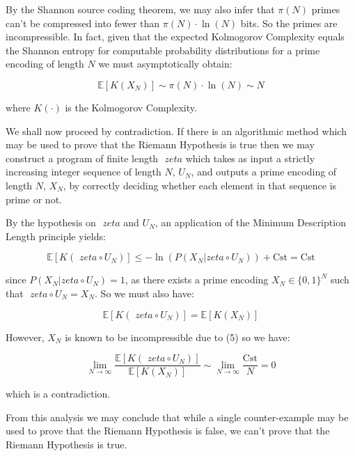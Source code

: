 \documentclass{article}
\begin{document}
By the Shannon source coding theorem, we may also infer that $\pi(N)$ primes can't be compressed into fewer than $\pi(N) \cdot \ln(N)$ bits. So the primes are incompressible. In fact, given that the expected Kolmogorov Complexity equals the Shannon entropy for computable probability distributions for a prime encoding of length $N$ we must asymptotically obtain:

\begin{equation}
\mathbb{E}[K(X_N)] \sim \pi(N) \cdot \ln(N) \sim N
\end{equation}

where $K(\cdot)$ is the Kolmogorov Complexity.

We shall now proceed by contradiction. If there is an algorithmic method which may be used to prove that the Riemann Hypothesis is true then we may construct a program of finite length $\textit{ zeta}$ which takes as input a strictly increasing integer sequence of length $N$, $U_N$, and outputs a prime encoding of length $N$, $X_N$, by correctly deciding whether each element in that sequence is prime or not.

By the hypothesis on $\textit{ zeta}$ and $U_N$, an application of the Minimum Description Length principle yields:

\begin{equation}
\mathbb{E}[K(\textit{ zeta} \circ U_N)] \leq -\ln(P(X_N \lvert \textit{zeta} \circ U_N)) + \text{Cst} = \text{Cst} 	
\end{equation}

since $P(X_N \lvert \textit{zeta} \circ U_N) = 1$, as there exists a prime encoding $X_N \in \{0,1\}^N$ such that $\textit{ zeta} \circ U_N = X_N$. So we must also have:

\begin{equation}
\mathbb{E}[K(\textit{ zeta} \circ U_N)] = \mathbb{E}[K(X_N)]
\end{equation}

However, $X_N$ is known to be incompressible due to (5) so we have:

\begin{equation}
\lim_{N \to \infty} \frac{\mathbb{E}[K(\textit{ zeta} \circ U_N)]}{\mathbb{E}[K(X_N)]} \sim \lim_{N \to \infty} \frac{\text{Cst}}{N} = 0
\end{equation}

which is a contradiction.

From this analysis we may conclude that while a single counter-example may be used to prove that the Riemann Hypothesis is false, we can't prove that the Riemann Hypothesis is true. 
\end{document}
